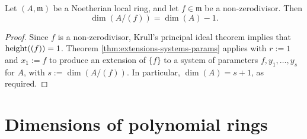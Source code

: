 \documentclass[reqno]{amsart}
\begin{document}
\begin{corollary}
  Let $(A,\mathfrak{m})$ be a Noetherian local ring,
  and let $f \in \mathfrak{m}$ be a non-zerodivisor.
  Then
  \[
  \dim(A/(f)) = \dim(A) - 1.
  \]
\end{corollary}
\begin{proof}
  Since $f$ is a non-zerodivisor,
  Krull's principal ideal theorem
  implies that $\operatorname{height}((f)) = 1$.
  Theorem \ref{thm:extensions-systems-params}
  applies with $r := 1$ and $x_1 := f$
  to produce an extension of $\{f\}$
  to a system of parameters
  $f,y_1,\dotsc,y_s$ for $A$,
  with $s := \dim(A/(f))$.
  In particular, $\dim(A) = s + 1$, as required.
\end{proof}



\section{Dimensions of polynomial rings}
\label{sec:org80bf51b}
\end{document}
